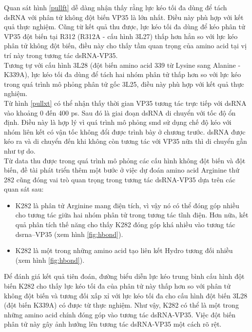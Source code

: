 \documentclass[12pt,a4paper,reqno, oneside]{book}
\begin{document}
Quan sát hình \ref{pullft} dễ dàng nhận thấy rằng lực kéo tối đa dùng để tách dsRNA với phân tử không đột biến VP35 là lớn nhất. Điều này phù hợp với kết quả thực nghiệm\cite{Leung2010}. Cũng từ kết quả thu được, lực kéo tối đa dùng để kéo phân tử VP35 đột biến tại R312 (\gls{R312A} - cấu hình 3L27) thấp hơn hẳn so với lực kéo phân tử không đột biến, điều này cho thấy tầm quan trọng của amino acid tại vị trí này trong tương tác dsRNA-VP35.\\
Tương tự với cấu hình 3L28 (đột biến amino acid 339 từ Lysine sang Alanine - \gls{K339A}), lực kéo tối đa dùng để tách hai nhóm phân tử thấp hơn so với lực kéo trong quá trình mô phỏng phân tử gốc 3L25, điều này phù hợp với kết quả thực nghiệm\cite{Leung2010}.\\
Từ hình \ref{pullxt} có thể nhận thấy thời gian VP35 tương tác trực tiếp với dsRNA vào khoảng 0 đến 400 ps. Sau đó là giai đoạn dsRNA di chuyển với tốc độ ổn định. Điều này là hợp lý vì quá trình mô phỏng \gls{smd} sử dụng chế độ kéo với nhóm liên kết có vận tốc không đổi được trình bày ở chương trước. dsRNA được kéo ra và di chuyển đến khi không còn tương tác với VP35 nữa thì di chuyển gần như tự do.\\
Từ data thu được trong quá trình mô phỏng các cấu hình không đột biến và đột biến, đề tài phát triển thêm một bước ở việc dự đoán amino acid Arginine thứ 282 cũng đóng vai trò quan trọng trong tương tác dsRNA-VP35 dựa trên các quan sát sau:
\begin{itemize}
\item K282 là phân tử Arginine mang điện tích, vì vậy nó có thể đóng góp nhiều cho tương tác giữa hai nhóm phân tử trong tương tác tĩnh điện. Hơn nữa, kết quả phân tích thế năng cho thấy K282 đóng góp khá nhiều vào tương tác \gls{dsrna}--VP35 (xem hình \ref{fig:hbond}).
\item K282 là một trong những amino acid tạo liên kết Hydro tương đối nhiều (xem hình \ref{fig:hbond}).
\end{itemize}
Để đánh giá kết quả tiên đoán, đường biểu diễn lực kéo trung bình cấu hình đột biến K282 cho thấy lực kéo tối đa của phân tử này thấp hơn so với phân tử không đột biến và tương đối xấp xỉ với lực kéo tối đa cho cấu hình đột biến 3L28 (đột biến K339A) có được từ thực nghiệm. Như vậy, K282 có thể là một trong những amino acid chính đóng góp vào tương tác dsRNA-VP35. Việc đột biến phân tử này gây ảnh hưởng lên tương tác dsRNA-VP35 một cách rõ rệt.
\end{document}
